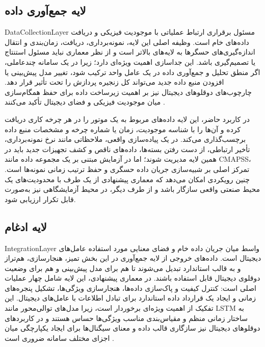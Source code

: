 \subsection{لایه جمع‌آوری داده}
\label{sec:layer-collection}

\gls{DataCollectionLayer} مسئول برقراری ارتباط عملیاتی با موجودیت فیزیکی و دریافت داده‌های خام است. وظیفه اصلی این لایه، نمونه‌برداری، دریافت، زمان‌بندی و انتقال اندازه‌گیری‌های حسگرها به لایه‌های بالاتر است و از نظر معماری نباید مسئول استنتاج یا تصمیم‌گیری باشد. این جداسازی اهمیت ویژه‌ای دارد؛ زیرا در یک سامانه چندعاملی، اگر منطق تحلیل و جمع‌آوری داده در یک عامل واحد ترکیب شود، تغییر مدل پیش‌بینی یا افزودن منبع داده جدید می‌تواند کل زنجیره پردازش را تحت تأثیر قرار دهد. چارچوب‌های  دوقلو‌های دیجیتال نیز بر اهمیت زیرساخت داده برای حفظ همگام‌سازی میان موجودیت فیزیکی و فضای دیجیتال تأکید می‌کنند \cite{qi2021enabling,fuller2020digital}.

در کاربرد حاضر، این لایه داده‌های مربوط به یک موتور را در هر چرخه کاری دریافت کرده و آن‌ها را با شناسه موجودیت، زمان یا شماره چرخه و مشخصات منبع داده برچسب‌گذاری می‌کند. در یک پیاده‌سازی واقعی، ملاحظاتی مانند نرخ نمونه‌برداری، تأخیر ارتباطی، از دست رفتن بسته‌ها، داده‌های ناقص و کشف تجهیزات جدید باید در همین لایه مدیریت شوند؛ اما در آزمایش مبتنی بر یک مجموعه داده مانند \gls{CMAPSS}، تمرکز اصلی بر شبیه‌سازی جریان داده حسگری و حفظ ترتیب زمانی نمونه‌ها است. چنین رویکردی امکان می‌دهد که معماری پیشنهادی از یک طرف با محدودیت‌های یک محیط صنعتی واقعی سازگار باشد و از طرف دیگر، در محیط آزمایشگاهی نیز به‌صورت قابل تکرار ارزیابی شود.


\subsection{لایه ادغام}
\label{sec:layer-integration}

\gls{IntegrationLayer} واسط میان جریان داده خام و فضای معنایی مورد استفاده عامل‌های دیجیتال است. داده‌های خروجی از لایه جمع‌آوری در این بخش تمیز، هنجارسازی، هم‌تراز و به قالب استاندارد تبدیل می‌شوند تا هم برای مدل پیش‌بینی و هم برای وضعیت دوقلوی دیجیتال قابل استفاده باشند. در معماری پیشنهادی، این لایه شامل چهار عملیات اصلی است: کنترل کیفیت و پاک‌سازی داده‌ها، هنجارسازی ویژگی‌ها، تشکیل پنجره‌های زمانی و ایجاد یک قرارداد داده استاندارد برای تبادل اطلاعات با عامل‌های دیجیتال. این تفکیک از اهمیت ویژه‌ای برخوردار است، زیرا مدل‌های توالی‌محور مانند LSTM به ساختار زمانی منظم و مقیاس‌بندی مناسب ویژگی‌ها حساس هستند \cite{heimes2008recurrent} و در کاربردهای  دوقلو‌های دیجیتال نیز سازگاری قالب داده و معنای سیگنال‌ها برای ایجاد یکپارچگی میان اجزای مختلف سامانه ضروری است \cite{qi2021enabling}.

